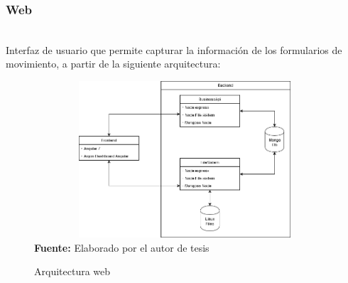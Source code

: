 \subsubsection{Web}\mbox{} \\
\label{ins:UI:web}
Interfaz de usuario que permite capturar la informaci\'on de los formularios de movimiento, a partir de la siguiente arquitectura:
\begin{figure}[H]
	\caption{Arquitectura web}
	\label{fig:architectureWeb}
	\centering
	\includegraphics[width=430px,height=220px]{graphics/webArchitecture.PNG} \\
	\textbf{Fuente:} Elaborado por el autor de tesis
\end{figure}
